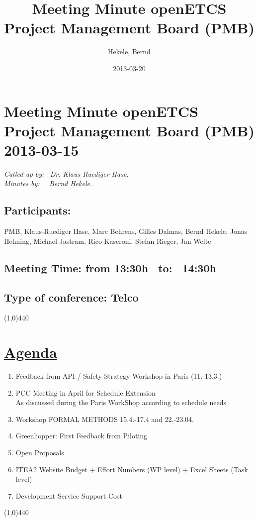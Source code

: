 \documentclass[a4paper]{article}
\title{Meeting Minute openETCS Project Management Board (PMB)}
\author{Hekele, Bernd}
\date{2013-03-20}
\begin{document}
\section*{\large{Meeting Minute openETCS Project Management Board (PMB) 2013-03-15}}

\emph{Called up by: \ Dr. Klaus Ruediger Hase.}\\
\emph{Minutes by: \ \  Bernd Hekele.}


\subsection*{Participants:} PMB, 
Klaus-Ruediger Hase, 
Marc Behrens, 
Gilles Dalmas,
Bernd Hekele,
Jonas Helming,
Michael Jastram, 
Rico Kaseroni, 
Stefan Rieger, 
Jan Welte\\



\subsection*{Meeting Time: from 13:30h \ to: \ 14:30h}

\subsection*{Type of conference: Telco}

\line(1,0){440}
\section*{\underline{Agenda}}
\begin{enumerate}
\item Feedback from API / Safety Strategy Workshop in Paris (11.-13.3.)
\item PCC Meeting in April for Schedule Extension\\
As discussed during the Paris WorkShop according to schedule needs
\item Workshop FORMAL METHODS 15.4.-17.4 and 22.-23.04.
\item Greenhopper:  First Feedback from Piloting
\item Open Proposals
\item ITEA2 Website Budget + Effort Numbers (WP level) + Excel Sheets (Task
level)

\item Development Service Support Cost\

\end{enumerate}
\line(1,0){440}
\end{document}

